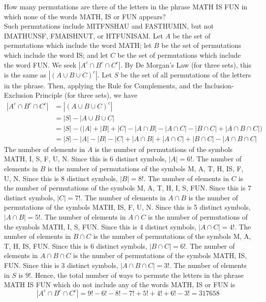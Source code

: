 \documentclass[handout]{ximera}
\begin{document}
\begin{example}[example 3]
How many permutations are there of the letters in the phrase MATH IS FUN in which none of the
words MATH, IS or FUN appears?\\
Such permutations include MITFNSHAU and FASTHUMIN, but not IMATHUNSF, FMAISHNUT, or HTFUNISAM.
Let $A$ be the set of permutations which include the word MATH; let $B$ be the set of permutations which include the word
IS; and let $C$ be the set of permutations which include the word FUN.  We seek $|A^c \cap B^c \cap C^c|$. 
By De Morgan's Law (for three sets), this is the same as $|(A \cup B\cup C)^c|$. 
Let $S$ be the set of all permutations of the letters in the phrase. Then, applying the Rule for Complements,
and the Inclusion-Exclusion Principle (for three sets), we have
\begin{align*}
|A^c \cap B^c \cap C^c| &= |(A \cup B \cup C)^c|\\
               &= |S| - |A\cup B \cup C|\\
               &= |S| - \Big(|A| + |B| + |C| -|A\cap B|-|A\cap C|-|B\cap C|+|A\cap B \cap C|\Big)\\
               &= |S| -|A| - |B| - |C| +|A\cap B|+|A\cap C|+|B\cap C|-|A\cap B \cap C|
\end{align*}
The number of elements in $A$ is the number of permutations of the symbols MATH, I, S, F, U, N.  
Since this is 6 distinct symbols, $|A| = 6!$. 
The number of elements in $B$ is the number of 
permutations of the symbols M, A, T, H, IS, F, U, N.  
Since this is 8 distinct symbols, $|B| = 8!$. 
The number of elements in $C$ is the number of 
permutations of the symbols M, A, T, H, I, S, FUN.  
Since this is 7 distinct symbols, $|C| = 7!$.
The number of elements in $A \cap B$ is the number of permutations of the symbols MATH, IS, F, U, N.  
Since this is 5 distinct symbols, $|A \cap B| = 5!$.
The number of elements in $A \cap C$ is the number of permutations of the symbols MATH, I, S, FUN.  
Since this is 4 distinct symbols, $|A \cap C| = 4!$.
The number of elements in $B \cap C$ is the number of permutations of the symbols M, A, T, H, IS, FUN.  
Since this is 6 distinct symbols, $|B \cap C| = 6!$.
The number of elements in $A \cap B\cap C$ is the number of permutations of the symbols MATH, IS, FUN.  
Since this is 3 distinct symbols, $|A \cap B\cap C| = 3!$.
The number of elements in $S$
is $9!$. Hence, the total number of ways to permute the letters in the phrase MATH IS FUN which do not 
include any of the words MATH, IS or FUN is
\[
|A^c \cap B^c \cap C^c| = 9! - 6! - 8! - 7! + 5! + 4! + 6! -3! = 317658
\]
\end{example}
\end{document}
